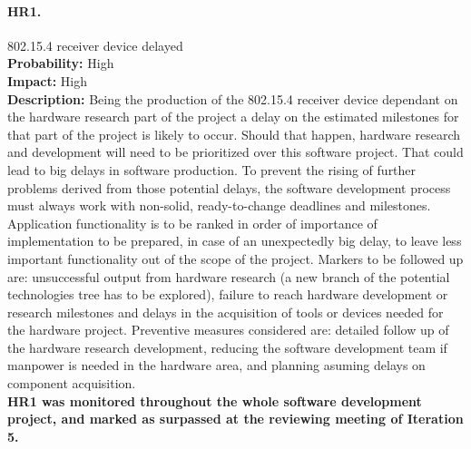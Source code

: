 		\paragraph{HR1.}802.15.4 receiver device delayed\\
		\textbf{Probability:} High\\
		\textbf{Impact:} High\\
		\textbf{Description:} Being the production of the 802.15.4 receiver device dependant on the hardware research part of the project a delay on the estimated milestones for that part of the project is likely to occur. Should that happen, hardware research and development will need to be prioritized over this software project. That could lead to big delays in software production.
		To prevent the rising of further problems derived from those potential delays, the software development process must always work with non-solid, ready-to-change deadlines and milestones. Application functionality is to be ranked in order of importance of implementation to be prepared, in case of an unexpectedly big delay, to leave less important functionality out of the scope of the project.
		Markers to be followed up are: unsuccessful output from hardware research (a new branch of the potential technologies tree has to be explored), failure to reach hardware development or research milestones and delays in the acquisition of tools or devices needed for the hardware project.
		Preventive measures considered are: detailed follow up of the hardware research development, reducing the software development team if manpower is needed in the hardware area, and planning asuming delays on component acquisition.\\
		\textbf{HR1 was monitored throughout the whole software development project, and marked as surpassed at the reviewing meeting of Iteration 5.}

